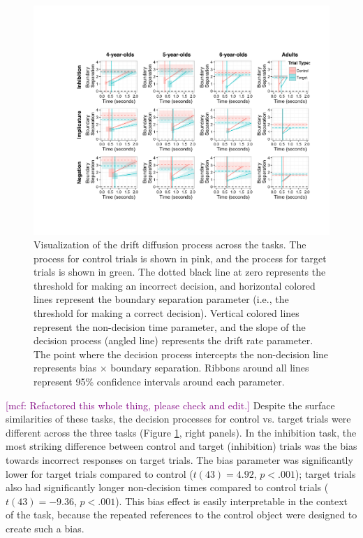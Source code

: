 \documentclass[10pt,letterpaper]{article}
\newcommand{\mcf}[1]{\textcolor{Purple}{[mcf: #1]}}
\begin{document}
\begin{figure}[t!]
\begin{center}
\includegraphics[width=7in]{figures/ddm_vis.pdf}
\caption{\label{fig:ddm} Visualization of the drift diffusion process across the tasks. The process for control trials is shown in pink, and the process for target trials is shown in green. The dotted black line at zero represents the threshold for making an incorrect decision, and horizontal colored lines represent the boundary separation parameter (i.e., the threshold for making a correct decision). Vertical colored lines represent the non-decision time parameter, and the slope of the decision process (angled line) represents the drift rate parameter. The point where the decision process intercepts the non-decision line represents bias $\times$ boundary separation. Ribbons around all lines represent 95\% confidence intervals around each parameter.}
\end{center}
\end{figure}

\mcf{Refactored this whole thing, please check and edit.}
Despite the surface similarities of these tasks, the decision processes for control vs. target trials were different across the three tasks (Figure \ref{fig:ddm}, right panels). In the inhibition task, the most striking difference between control and target (inhibition) trials was the bias towards incorrect responses on target trials. The bias parameter was significantly lower  for target trials compared to control ($t(43) = 4.92$, $p< .001$); target trials also had significantly longer non-decision times compared to control trials ($t(43) = -9.36$, $p< .001$). This bias effect is easily interpretable in the context of the task, because the repeated references to the control object were designed to create such a bias.
\end{document}
